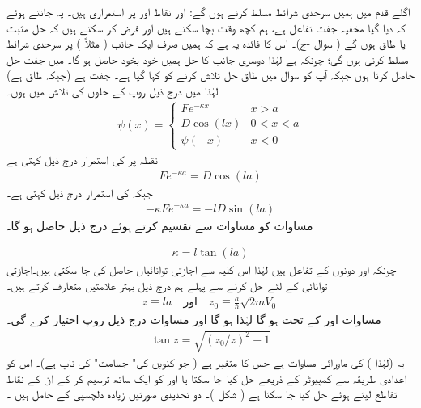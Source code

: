  اگلے قدم میں ہمیں سرحدی شرائط مسلط کرنے ہوں گے: اور  نقاط  اور پر استمراری ہیں۔ یہ جانتے ہوئے کہ دیا گیا مخفیہ جفت تفاعل ہے، ہم کچھ وقت بچا سکتے ہیں اور فرض کر سکتے ہیں کہ حل مثبت یا طاق ہوں گے ( سوال -ج)۔ اس کا فائدہ یہ ہے کہ ہمیں صرف ایک جانب ( مثلاً ) پر سرحدی شرائط مسلط کرنی ہوں گی؛ چونکہ ہے لہٰذا دوسری جانب کا حل ہمیں خود بخود حاصل ہو گا۔ میں جفت حل حاصل کرتا ہوں جبکہ آپ کو سوال  میں طاق حل تلاش کرنے کو کہا گیا ہے۔ جفت ہے (جبکہ طاق ہے) لہٰذا میں درج ذیل روپ کے حلوں کی تلاش میں ہوں۔ 
\begin{align}\label{مساوات_شروڈنگر_تلاش_تفاعلات}
\psi(x)=
\begin{cases}
Fe^{-\kappa x} & x> a\\
D\cos(l x) & 0< x < a\\
\psi(-x) & x< 0
\end{cases}
\end{align}
نقطہ پر  کی استمرار درج ذیل کہتی ہے 
\begin{align}\label{مساوات_شروڈنگر_استمرار_مستقل_الف}
 Fe^{-\kappa a}=D\cos(la) 
 \end{align}
 جبکہ  کی استمرار درج ذیل کہتی ہے۔
 \begin{align}\label{مساوات_شروڈنگر_استمرار_مستقل_ب}
 -\kappa Fe^{-\kappa a}=-lD\sin(la) 
 \end{align} 
 مساوات  کو مساوات  سے تقسیم کرتے ہوئے درج ذیل حاصل ہو گا۔

\begin{align}\label{مساوات_شروڈنگر_حل_کپا}
\kappa =l\tan(la) 
 \end{align}
 چونکہ  اور  دونوں  کے تفاعل ہیں لہٰذا اس کلیہ سے اجازتی توانائیاں حاصل کی جا سکتی ہیں۔اجازتی توانائی کے لئے حل کرنے سے پہلے ہم درج ذیل بہتر علامتیں متعارف کرتے ہیں۔
\begin{align}
z\equiv l a \quad \text{اور}\quad z_0\equiv\frac{a}{\hslash}\sqrt{2mV_0}
\end{align} 
مساوات  اور  کے تحت  ہو گا لہٰذا  ہو گا اور مساوات  درج ذیل روپ اختیار کرے گی۔
\begin{align}\label{مساوات_غیر_تابع_شروڈنگر_ترسیمی_حل}
\tan z=\sqrt{(z_{0}/z)^{2}-1} 
\end{align}
 یہ  (لہٰذا ) کی ماورائی مساوات ہے جس کا متغیر  ہے ( جو کنویں  کی" جسامت" کی ناپ ہے)۔ اس کو اعدادی طریقہ سے کمپیوٹر کے ذریعے حل کیا جا سکتا یا  اور  کو ایک ساتھ ترسیم کر کے ان کے نقاط تقاطع لیتے ہوئے حل کیا جا سکتا ہے ( شکل )۔ دو تحدیدی صورتیں زیادہ دلچسپی کے حامل ہیں ۔ 
 
